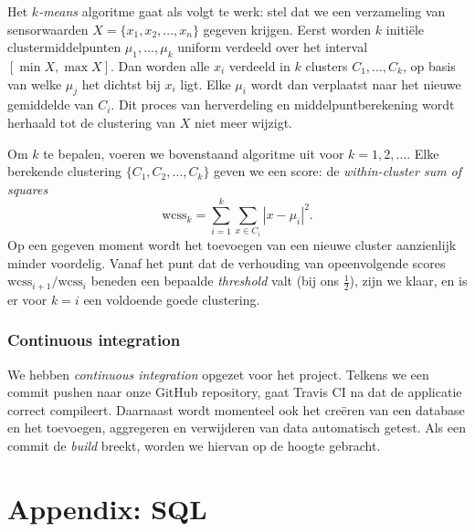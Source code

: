 \documentclass[12pt,parskip=full]{article}
\begin{document}
Het \textit{$k$-means} algoritme gaat als volgt te werk: stel dat we een 
verzameling van sensorwaarden $X = \{x_1, x_2, \dots, x_n\}$ gegeven krijgen. 
Eerst worden $k$ initi\"ele cluster\-middelpunten $\mu_1, \dots, \mu_k$ uniform 
verdeeld over het 
interval $[\min X, \max X]$. Dan worden alle $x_i$ verdeeld in $k$ 
clusters $C_1, \dots, C_k$, op basis van welke $\mu_j$ het dichtst bij $x_i$ 
ligt. Elke $\mu_i$ wordt dan verplaatst naar het nieuwe gemiddelde van $C_i$. 
Dit proces van herverdeling en middelpuntberekening wordt 
herhaald tot de clustering van $X$ niet meer wijzigt.

Om $k$ te bepalen, voeren we bovenstaand algoritme uit voor $k = 1, 2, \dots$. 
Elke 
berekende
clustering $\{C_1, C_2, \dots, C_k\}$ geven we een score: de 
\textit{within-cluster sum of squares} \[
\text{wcss}_k = \sum_{i=1}^k \sum_{x \in C_i} \left| x - \mu_i \right|^2.
\]
Op een gegeven moment wordt het toevoegen van een nieuwe cluster aanzienlijk 
minder voordelig. Vanaf het punt dat de verhouding van opeenvolgende scores 
$\text{wcss}_{i+1} / \text{wcss}_{i}$ 
beneden een bepaalde \textit{threshold} valt (bij ons $\frac 12$), zijn we 
klaar, en is er voor $k=i$ een voldoende goede clustering.

\subsubsection{Continuous integration}

We hebben
\emph{continuous integration} opgezet voor het project. Telkens we een {commit} 
pushen naar onze GitHub {repository}, gaat Travis CI na dat de applicatie 
correct compileert. Daarnaast wordt 
momenteel ook het cre\"eren van een database en het toevoegen, aggregeren en 
verwijderen van data automatisch getest. Als een commit de \textit{build} 
breekt, worden we hiervan op de hoogte gebracht.


\pagebreak
{}
\section{Appendix: SQL}
\label{dbschema}
\lstset{language=SQL,basicstyle=\ttfamily}


\pagebreak
\def\arraystretch{1.8}
\newcommand{\argu}[1]{\textbf{<\textit{#1}>}}
\newcommand{\getallDesc}[1]{Toont een JSON-lijst van alle \code{#1} records.}
\newcommand{\getDesc}[1]{Toont de \code{#1} met de gegeven ID.}
\newcommand{\insertDesc}[1]{Leest een \code{#1{}Data} JSON-object uit de
  request body, en maakt een nieuwe \code{#1} aan in de database.}
\newcommand{\deleteDesc}[1]{Verwijdert de \code{#1} met
  de gegeven ID uit de database.}
\newcommand{\crud}[3]{
  \code{GET /api/{#1}} & \getallDesc{#2} \\
  \code{GET /api/{#1}/\argu{#3}} & \getDesc{#2} \\
  \code{POST /api/{#1}} & \insertDesc{#2} \\
  \code{DELETE /api/{#1}/\argu{#3}} & \deleteDesc{#2}
}
\end{document}
